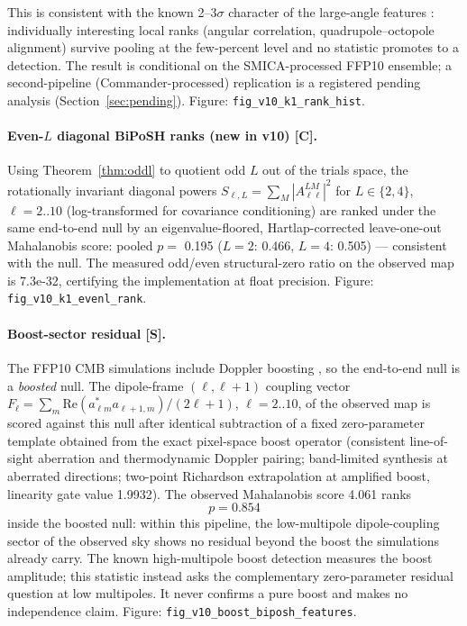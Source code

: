 \documentclass[10pt]{article}
\theoremstyle{definition}
\newcommand{\code}[1]{\texttt{\small #1}}
\newcommand{\tier}[1]{\textbf{[#1]}}
\begin{document}
This is consistent with the known 2--3$\sigma$ character of the
large-angle features \cite{Planck2018VII, Schwarz2016}: individually
interesting local ranks (angular correlation, quadrupole--octopole
alignment) survive pooling at the few-percent level and no statistic
promotes to a detection. The result is conditional on the
SMICA-processed FFP10 ensemble; a second-pipeline (Commander-processed)
replication is a registered pending analysis
(Section~\ref{sec:pending}). Figure: \code{fig\_v10\_k1\_rank\_hist}.

\paragraph{Even-$L$ diagonal BiPoSH ranks (new in v10) \tier{C}.}
Using Theorem~\ref{thm:oddl} to quotient odd $L$ out of the trials
space, the rotationally invariant diagonal powers
$S_{\ell,L} = \sum_M |A^{LM}_{\ell\ell}|^2$ for $L \in \{2,4\}$,
$\ell = 2..10$ (log-transformed for covariance conditioning) are
ranked under the same end-to-end null by an eigenvalue-floored,
Hartlap-corrected \cite{Hartlap2007} leave-one-out Mahalanobis score:
pooled $p = $ 0.195 ($L=2$: 0.466, $L=4$: 0.505) ---
consistent with the null. The measured odd/even structural-zero ratio
on the observed map is 7.3e-32, certifying the implementation
at float precision. Figure: \code{fig\_v10\_k1\_evenl\_rank}.

\paragraph{Boost-sector residual \tier{S}.}
The FFP10 CMB simulations include Doppler boosting
\cite{Planck2018III}, so the end-to-end null is a \emph{boosted} null.
The dipole-frame $(\ell,\ell+1)$ coupling vector
$F_\ell = \sum_m \mathrm{Re}(a^*_{\ell m}a_{\ell+1,m})/(2\ell+1)$,
$\ell = 2..10$, of the observed map is scored against this null after
identical subtraction of a fixed zero-parameter template obtained from
the exact pixel-space boost operator (consistent line-of-sight
aberration and thermodynamic Doppler pairing; band-limited synthesis
at aberrated directions; two-point Richardson extrapolation at
amplified boost, linearity gate value 1.9932). The observed
Mahalanobis score 4.061 ranks
\begin{equation}
p = 0.854
\end{equation}
inside the boosted null: within this pipeline, the low-multipole
dipole-coupling sector of the observed sky shows no residual beyond
the boost the simulations already carry. The known high-multipole
boost detection \cite{Planck2013XXVII} measures the boost amplitude;
this statistic instead asks the complementary zero-parameter residual
question at low multipoles. It never confirms a pure boost and makes
no independence claim. Figure: \code{fig\_v10\_boost\_biposh\_features}.
\end{document}
